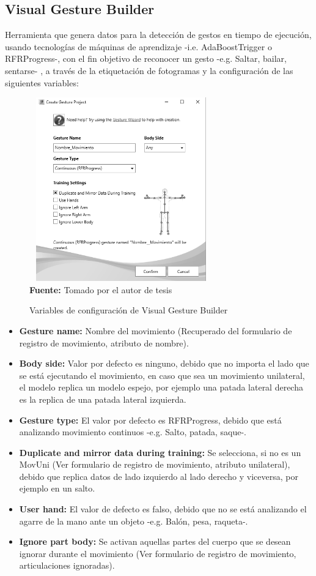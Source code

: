 \subsection{Visual Gesture Builder} \label{ins:VisualGestureBuilder}
Herramienta que genera datos para la detecci\'on de gestos en tiempo de ejecuci\'on, usando tecnolog\'ias de m\'aquinas de aprendizaje -i.e. AdaBoostTrigger o RFRProgress-, con el fin objetivo de reconocer un gesto -e.g. Saltar, bailar, sentarse- \cite{KinectBuilder2019}, a trav\'es de la etiquetaci\'on de fotogramas y la configuraci\'on de las siguientes variables:
 \begin{figure}[H]
	\caption{Variables de configuraci\'on de Visual Gesture Builder}
	\label{fig:visualGesture}
	\centering
	\includegraphics[width=300px,height=300px]{graphics/settingsGesture.PNG} \\
	\textbf{Fuente:} Tomado por el autor de tesis
\end{figure} 
\begin{itemize}
\item \textbf{Gesture name:} Nombre del movimiento  (Recuperado del formulario de registro de movimiento, atributo de nombre).
\item \textbf{Body side:} Valor por defecto es  ninguno, debido que no importa el lado que se est\'a ejecutando el movimiento, en caso que sea un movimiento unilateral, el modelo replica un modelo espejo, por ejemplo una patada lateral derecha es la replica de una patada lateral izquierda.
\item \textbf{Gesture type:} El valor por defecto es RFRProgress, debido que est\'a analizando movimiento continuos -e.g. Salto, patada, saque-.
\item \textbf{Duplicate and mirror data during training:} Se selecciona, si no es un \gls{MovUni} (Ver formulario de registro de movimiento, atributo unilateral), debido que replica datos de lado izquierdo al lado derecho y viceversa, por ejemplo en un salto.
\item \textbf{User hand:} El valor de defecto es falso, debido que no se est\'a analizando el agarre de la mano ante un objeto -e.g. Bal\'on, pesa, raqueta-.
\item \textbf{Ignore part body:} Se activan  aquellas partes del cuerpo que se desean ignorar durante el movimiento (Ver formulario de registro de movimiento, articulaciones ignoradas).
\end{itemize}
